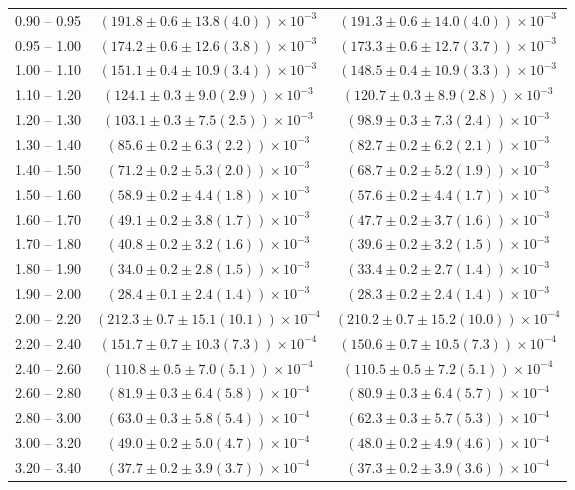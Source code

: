 \begin{table}
\begin{center}
\begin{tabular}{ c | c c }
0.90 -- 0.95 & $(191.8\pm0.6\pm13.8(4.0))\times10^{-3}$ & $(191.3\pm0.6\pm14.0(4.0))\times10^{-3}$ \\ 
0.95 -- 1.00 & $(174.2\pm0.6\pm12.6(3.8))\times10^{-3}$ & $(173.3\pm0.6\pm12.7(3.7))\times10^{-3}$ \\ 
1.00 -- 1.10 & $(151.1\pm0.4\pm10.9(3.4))\times10^{-3}$ & $(148.5\pm0.4\pm10.9(3.3))\times10^{-3}$ \\ 
1.10 -- 1.20 & $(124.1\pm0.3\pm9.0(2.9))\times10^{-3}$ & $(120.7\pm0.3\pm8.9(2.8))\times10^{-3}$ \\ 
1.20 -- 1.30 & $(103.1\pm0.3\pm7.5(2.5))\times10^{-3}$ & $(98.9\pm0.3\pm7.3(2.4))\times10^{-3}$ \\ 
1.30 -- 1.40 & $(85.6\pm0.2\pm6.3(2.2))\times10^{-3}$ & $(82.7\pm0.2\pm6.2(2.1))\times10^{-3}$ \\ 
1.40 -- 1.50 & $(71.2\pm0.2\pm5.3(2.0))\times10^{-3}$ & $(68.7\pm0.2\pm5.2(1.9))\times10^{-3}$ \\ 
1.50 -- 1.60 & $(58.9\pm0.2\pm4.4(1.8))\times10^{-3}$ & $(57.6\pm0.2\pm4.4(1.7))\times10^{-3}$ \\ 
1.60 -- 1.70 & $(49.1\pm0.2\pm3.8(1.7))\times10^{-3}$ & $(47.7\pm0.2\pm3.7(1.6))\times10^{-3}$ \\ 
1.70 -- 1.80 & $(40.8\pm0.2\pm3.2(1.6))\times10^{-3}$ & $(39.6\pm0.2\pm3.2(1.5))\times10^{-3}$ \\ 
1.80 -- 1.90 & $(34.0\pm0.2\pm2.8(1.5))\times10^{-3}$ & $(33.4\pm0.2\pm2.7(1.4))\times10^{-3}$ \\ 
1.90 -- 2.00 & $(28.4\pm0.1\pm2.4(1.4))\times10^{-3}$ & $(28.3\pm0.2\pm2.4(1.4))\times10^{-3}$ \\ 
2.00 -- 2.20 & $(212.3\pm0.7\pm15.1(10.1))\times10^{-4}$ & $(210.2\pm0.7\pm15.2(10.0))\times10^{-4}$ \\ 
2.20 -- 2.40 & $(151.7\pm0.7\pm10.3(7.3))\times10^{-4}$ & $(150.6\pm0.7\pm10.5(7.3))\times10^{-4}$ \\ 
2.40 -- 2.60 & $(110.8\pm0.5\pm7.0(5.1))\times10^{-4}$ & $(110.5\pm0.5\pm7.2(5.1))\times10^{-4}$ \\ 
2.60 -- 2.80 & $(81.9\pm0.3\pm6.4(5.8))\times10^{-4}$ & $(80.9\pm0.3\pm6.4(5.7))\times10^{-4}$ \\ 
2.80 -- 3.00 & $(63.0\pm0.3\pm5.8(5.4))\times10^{-4}$ & $(62.3\pm0.3\pm5.7(5.3))\times10^{-4}$ \\ 
3.00 -- 3.20 & $(49.0\pm0.2\pm5.0(4.7))\times10^{-4}$ & $(48.0\pm0.2\pm4.9(4.6))\times10^{-4}$ \\ 
3.20 -- 3.40 & $(37.7\pm0.2\pm3.9(3.7))\times10^{-4}$ & $(37.3\pm0.2\pm3.9(3.6))\times10^{-4}$ \\ 

\end{tabular}
\end{center}
\end{table}
